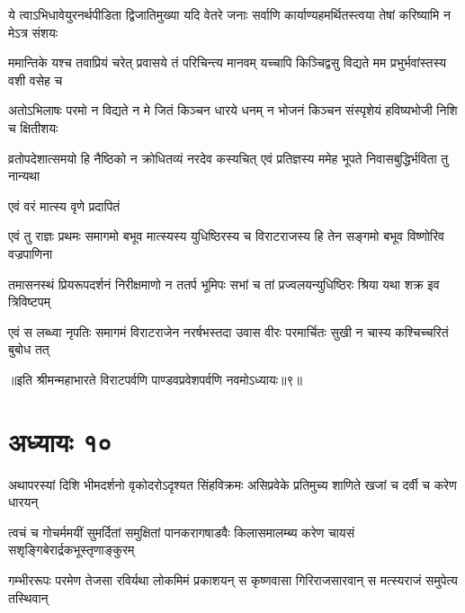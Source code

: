 \fourlineindentedshloka
{ये त्वाऽभिधावेयुरनर्थपीडिता}
{द्विजातिमुख्या यदि वेतरे जनाः}
{सर्वाणि कार्याण्यहमर्थितस्त्वया}
{तेषां करिष्यामि न मेऽत्र संशयः}


\fourlineindentedshloka
{ममान्तिके यश्च तवाप्रियं चरेत्}
{प्रवासये तं परिचिन्त्य मानवम्}
{यच्चापि किञ्चिद्वसु विद्यते मम}
{प्रभुर्भवांस्तस्य वशी वसेह च}




\fourlineindentedshloka
{अतोऽभिलाषः परमो न विद्यते}
{न मे जितं किञ्चन धारये धनम्}
{न भोजनं किञ्चन संस्पृशेयं}
{हविष्यभोजी निशि च क्षितीशयः}


\fourlineindentedshloka
{व्रतोपदेशात्समयो हि नैष्ठिको}
{न क्रोधितव्यं नरदेव कस्यचित्}
{एवं प्रतिज्ञस्य ममेह भूपते}
{निवासबुद्धिर्भविता तु नान्यथा}


{एवं वरं मात्स्य वृणे प्रदापितं\hspace{\shlokaspaceskip}}\\



\fourlineindentedshloka
{एवं तु राज्ञः प्रथमः समागमो}
{बभूव मात्स्यस्य युधिष्ठिरस्य च}
{विराटराजस्य हि तेन सङ्गमो}
{बभूव विष्णोरिव वज्रपाणिना}


\fourlineindentedshloka
{तमासनस्थं प्रियरूपदर्शनं}
{निरीक्षमाणो न ततर्प भूमिपः}
{सभां च तां प्रज्वलयन्युधिष्ठिरः}
{श्रिया यथा शक्र इव त्रिविष्टपम्}


\fourlineindentedshloka
{एवं स लब्ध्वा नृपतिः समागमं}
{विराटराजेन नरर्षभस्तदा}
{उवास वीरः परमार्चितः सुखी}
{न चास्य कश्चिच्चरितं बुबोध तत्}

॥इति श्रीमन्महाभारते विराटपर्वणि पाण्डवप्रवेशपर्वणि नवमोऽध्यायः॥९॥

\chapter{अध्यायः १०}

\fourlineindentedshloka
{अथापरस्यां दिशि भीमदर्शनो}
{वृकोदरोऽदृश्यत सिंहविक्रमः}
{असिप्रवेके प्रतिमुच्य शाणिते}
{खजां च दर्वी च करेण धारयन्}


\fourlineindentedshloka
{त्वचं च गोचर्ममयीं सुमर्दितां}
{समुक्षितां पानकरागषाडवैः}
{किलासमालम्ब्य करेण चायसं}
{सशृङ्गिबेरार्द्रकभूस्तृणाङ्कुरम्}


\fourlineindentedshloka
{गम्भीररूपः परमेण तेजसा}
{रविर्यथा लोकमिमं प्रकाशयन्}
{स कृष्णवासा गिरिराजसारवान्}
{स मत्स्यराजं समुपेत्य तस्थिवान्}


